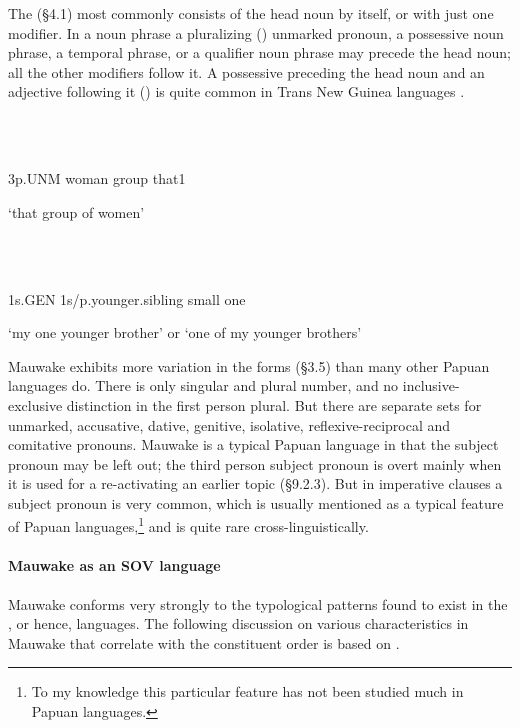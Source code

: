 The  ({\S}4.1) most commonly consists of the head noun by itself, or with just one modifier.  In a noun phrase a pluralizing () unmarked pronoun, a possessive noun phrase, a temporal phrase, or a qualifier noun phrase may precede the head noun; all the other modifiers follow it. A possessive preceding the head noun and an adjective following it () is quite common in Trans New Guinea languages \citep[19]{Reesink1987}. 

\ea%
\label{ex:x658}
\gll {} \\
      \\
\glt
\z

3p.UNM  woman  group  that1

`that group of women'

\ea%
\label{ex:x660}
\gll {}  \\
      \\
\glt
\z

1s.GEN  1s/p.younger.sibling  small  one

`my one younger brother' or `one of my younger brothers'

Mauwake exhibits more variation in the  forms ({\S}3.5) than many other Papuan languages do.  There is only singular and plural number, and no inclusive-exclusive distinction in the first person plural.  But there are separate sets for unmarked, accusative, dative, genitive, isolative, reflexive-reciprocal and comitative pronouns.  Mauwake is a typical Papuan language in that the subject pronoun may be left out; the third person subject pronoun is overt  mainly when it is used for a re-activating an earlier topic ({\S}9.2.3).  But in imperative clauses a subject pronoun is very common, which is  usually mentioned as a typical feature of Papuan languages,\footnote{To my knowledge this particular feature has not been studied much in Papuan languages.}  and is quite rare cross-linguistically.

\paragraph[Mauwake as an SOV language]{Mauwake as an SOV language}
\hypertarget{RefHeading18641935131865}{}Mauwake conforms very strongly to the typological patterns found to exist in the , or hence,  languages.  The following discussion on various characteristics in Mauwake that correlate with the  constituent order is based on \citet{Dryer2007a}.

